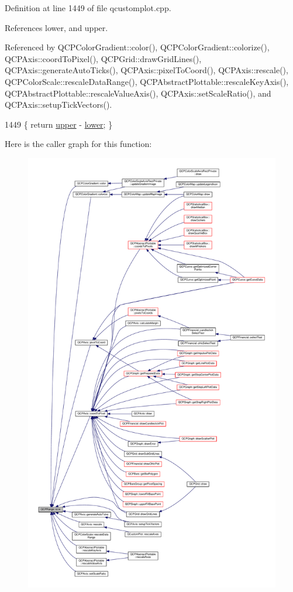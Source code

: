 Definition at line 1449 of file qcustomplot.\+cpp.



References lower, and upper.



Referenced by Q\+C\+P\+Color\+Gradient\+::color(), Q\+C\+P\+Color\+Gradient\+::colorize(), Q\+C\+P\+Axis\+::coord\+To\+Pixel(), Q\+C\+P\+Grid\+::draw\+Grid\+Lines(), Q\+C\+P\+Axis\+::generate\+Auto\+Ticks(), Q\+C\+P\+Axis\+::pixel\+To\+Coord(), Q\+C\+P\+Axis\+::rescale(), Q\+C\+P\+Color\+Scale\+::rescale\+Data\+Range(), Q\+C\+P\+Abstract\+Plottable\+::rescale\+Key\+Axis(), Q\+C\+P\+Abstract\+Plottable\+::rescale\+Value\+Axis(), Q\+C\+P\+Axis\+::set\+Scale\+Ratio(), and Q\+C\+P\+Axis\+::setup\+Tick\+Vectors().


\begin{DoxyCode}
1449 \{ \textcolor{keywordflow}{return} \hyperlink{class_q_c_p_range_ae44eb3aafe1d0e2ed34b499b6d2e074f}{upper} - \hyperlink{class_q_c_p_range_aa3aca3edb14f7ca0c85d912647b91745}{lower}; \}
\end{DoxyCode}


Here is the caller graph for this function\+:\nopagebreak
\begin{figure}[H]
\begin{center}
\leavevmode
\includegraphics[height=550pt]{class_q_c_p_range_afa57c13049b965edb6fd1c00ac56338a_icgraph}
\end{center}
\end{figure}


